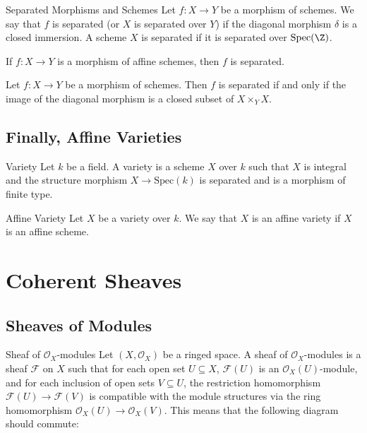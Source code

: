 \documentclass[a4paper]{article}
\begin{document}
\begin{defn}{Separated Morphisms and Schemes}{} Let $f:X\to Y$ be a morphism of schemes. We say that $f$ is separated (or $X$ is separated over $Y$) if the diagonal morphism $\delta$ is a closed immersion. A scheme $X$ is separated if it is separated over $\text{Spec}(\Z)$. 
\end{defn}

\begin{prp}{}{} If $f:X\to Y$ is a morphism of affine schemes, then $f$ is separated. 
\end{prp}

\begin{prp}{}{} Let $f:X\to Y$ be a morphism of schemes. Then $f$ is separated if and only if the image of the diagonal morphism is a closed subset of $X\times_Y X$. 
\end{prp}

\subsection{Finally, Affine Varieties}
\begin{defn}{Variety}{} Let $k$ be a field. A variety is a scheme $X$ over $k$ such that $X$ is integral and the structure morphism $X\to\text{Spec}(k)$ is separated and is a morphism of finite type. 
\end{defn}

\begin{defn}{Affine Variety}{} Let $X$ be a variety over $k$. We say that $X$ is an affine variety if $X$ is an affine scheme. 
\end{defn}

\pagebreak
\section{Coherent Sheaves}
\subsection{Sheaves of Modules}
\begin{defn}{Sheaf of $\mathcal{O}_X$-modules}{} Let $(X,\mathcal{O}_X)$ be a ringed space. A sheaf of $\mathcal{O}_X$-modules is a sheaf $\mathcal{F}$ on $X$ such that for each open set $U\subseteq X$, $\mathcal{F}(U)$ is an $\mathcal{O}_X(U)$-module, and for each inclusion of open sets $V\subseteq U$, the restriction homomorphism $\mathcal{F}(U)\to\mathcal{F}(V)$ is compatible with the module structures via the ring homomorphism $\mathcal{O}_X(U)\to\mathcal{O}_X(V)$. This means that the following diagram should commute: \\~\\
 \\
\end{defn}
\end{document}
